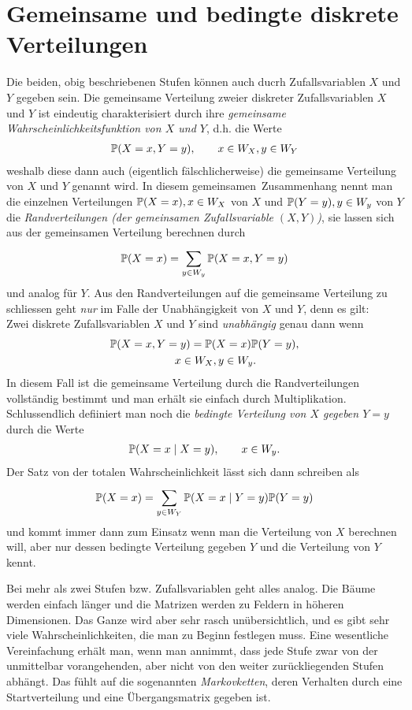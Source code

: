 \section{Gemeinsame und bedingte diskrete Verteilungen}
Die beiden, obig beschriebenen Stufen können auch ducrh Zufallsvariablen $X$ und $Y$ gegeben sein. Die gemeinsame Verteilung zweier diskreter Zufallsvariablen $X$ und $Y$ ist eindeutig charakterisiert durch ihre \emph{gemeinsame Wahrscheinlichkeitsfunktion von $X$ und $Y$}, d.h. die Werte
\begin{gather*}
	\mathbb P(X=x,Y=y), \qquad x\in W_{X}, y\in W_{Y}
\end{gather*}
	weshalb diese dann auch (eigentlich fälschlicherweise) die gemeinsame Verteilung von $X$ und $Y$ genannt wird. In diesem \glqq gemeinsamen\grqq\ Zusammenhang nennt man die einzelnen Verteilungen $\mathbb P(X=x), x\in W_X$ von $X$ und $\mathbb P(Y=y), y\in W_y$ von $Y$ die \emph{Randverteilungen (der gemeinsamen Zufallsvariable $(X,Y)$)}, sie lassen sich aus der gemeinsamen Verteilung berechnen durch
\begin{gather*}
	\mathbb P(X=x)=\sum_{y\in W_y}^{}\mathbb P(X=x,Y=y)
\end{gather*}
und analog für $Y$. Aus den Randverteilungen auf die gemeinsame Verteilung zu schliessen geht \emph{nur} im Falle der Unabhängigkeit von $X$ und $Y$, denn es gilt: \\
Zwei diskrete Zufallsvariablen $X$ und $Y$ sind \emph{unabhängig} genau dann wenn
\begin{gather*}
	\mathbb P(X=x,Y=y)=\mathbb P(X=x)\mathbb P(Y=y),\\\qquad x\in W_X,y\in W_y.
\end{gather*}
In diesem Fall ist die gemeinsame Verteilung durch die Randverteilungen vollständig bestimmt und man erhält sie einfach durch Multiplikation. Schlussendlich defiiniert man noch die \emph{bedingte Verteilung von $X$ gegeben $Y=y$} durch die Werte
\begin{gather*}
	\mathbb P(X=x\mid X=y),\qquad x\in W_{y}.
\end{gather*}
Der Satz von der totalen Wahrscheinlichkeit lässt sich dann schreiben als
\begin{gather*}
	\mathbb P(X=x)=\sum_{y\in W_{Y}}^{}\mathbb P(X=x\mid Y=y)\mathbb P(Y=y)
\end{gather*}
und kommt immer dann zum Einsatz wenn man die Verteilung von $X$ berechnen will, aber nur dessen bedingte Verteilung gegeben $Y$ und die Verteilung von $Y$ kennt.

Bei mehr als zwei Stufen bzw. Zufallsvariablen geht alles analog. Die Bäume werden einfach länger und die Matrizen werden zu Feldern in höheren Dimensionen. Das Ganze wird aber sehr rasch unübersichtlich, und es gibt sehr viele Wahrscheinlichkeiten, die man zu Beginn festlegen muss. Eine wesentliche Vereinfachung erhält man, wenn man annimmt, dass jede Stufe zwar von der unmittelbar vorangehenden, aber nicht von den weiter zurückliegenden Stufen abhängt. Das fühlt auf die sogenannten \emph{Markovketten}, deren Verhalten durch eine Startverteilung und eine Übergangsmatrix gegeben ist.
